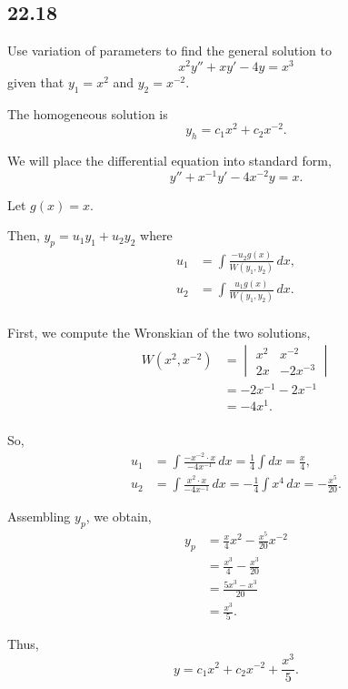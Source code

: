 \documentclass[../hw6]{subfiles}
\begin{document}
\subsection*{22.18}

Use variation of parameters to find the general solution to 
\[x^2y''+xy'-4y=x^3\] given that $y_1=x^2$ and $y_2=x^{-2}$.

The homogeneous solution is \[y_h=c_1x^2+c_2x^{-2}.\]

We will place the differential equation into standard form,
\[y''+x^{-1}y'-4x^{-2}y=x.\]

Let $g(x)=x$.

Then, $y_p=u_1y_1+u_2y_2$ where
\begin{align*}
    u_1&=\int\frac{-u_2g(x)}{W(y_1,y_2)}\,dx,\\
    u_2&=\int\frac{u_1g(x)}{W(y_1,y_2)}\,dx.\\
\end{align*}

First, we compute the Wronskian of the two solutions,
\begin{align*}
    W(x^2, x^{-2}) &= \begin{vmatrix}
        x^2 & x^{-2} \\
        2x & -2x^{-3}
    \end{vmatrix} \\
    &=-2x^{-1}-2x^{-1} \\
    &= -4x^1. \\
\end{align*}

So,
\begin{align*}
    u_1&=\int\frac{-x^{-2}\cdot x}{-4x^{-1}}\,dx=\frac{1}{4}\int dx=\frac{x}{4},\\
    u_2&=\int\frac{x^2\cdot x}{-4x^{-1}}\,dx=-\frac{1}{4}\int x^4\,dx=-\frac{x^5}{20}.
\end{align*}

Assembling $y_p$, we obtain,
\begin{align*}
    y_p&=\frac{x}{4}x^2-\frac{x^5}{20}x^{-2}\\
    &=\frac{x^3}{4}-\frac{x^3}{20}\\
    &=\frac{5x^3-x^3}{20}\\
    &=\frac{x^3}{5}.
\end{align*}

Thus,
\[y=c_1x^2+c_2x^{-2}+\frac{x^3}{5}.\]
\end{document}
